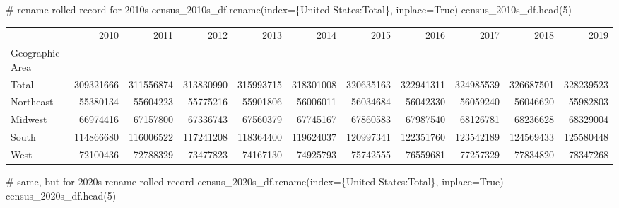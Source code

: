 \documentclass[
  letterpaper,
  DIV=11,
  numbers=noendperiod]{scrreprt}
\newenvironment{Shaded}{\begin{snugshade}}{\end{snugshade}}
\newcommand{\CommentTok}[1]{\textcolor[rgb]{0.37,0.37,0.37}{#1}}
\newcommand{\DecValTok}[1]{\textcolor[rgb]{0.68,0.00,0.00}{#1}}
\newcommand{\NormalTok}[1]{\textcolor[rgb]{0.00,0.23,0.31}{#1}}
\newcommand{\OperatorTok}[1]{\textcolor[rgb]{0.37,0.37,0.37}{#1}}
\newcommand{\StringTok}[1]{\textcolor[rgb]{0.13,0.47,0.30}{#1}}
\newcommand{\VariableTok}[1]{\textcolor[rgb]{0.07,0.07,0.07}{#1}}
\begin{document}
\begin{Shaded}
\begin{Highlighting}[]
\CommentTok{\# rename rolled record for 2010s}
\NormalTok{census\_2010s\_df.rename(index}\OperatorTok{=}\NormalTok{\{}\StringTok{\textquotesingle{}United States\textquotesingle{}}\NormalTok{:}\StringTok{\textquotesingle{}Total\textquotesingle{}}\NormalTok{\}, inplace}\OperatorTok{=}\VariableTok{True}\NormalTok{)}
\NormalTok{census\_2010s\_df.head(}\DecValTok{5}\NormalTok{)}
\end{Highlighting}
\end{Shaded}

\begin{tabular}{lrrrrrrrrrr}
\toprule
{} &       2010 &       2011 &       2012 &       2013 &       2014 &       2015 &       2016 &       2017 &       2018 &       2019 \\
Geographic Area &            &            &            &            &            &            &            &            &            &            \\
\midrule
Total           &  309321666 &  311556874 &  313830990 &  315993715 &  318301008 &  320635163 &  322941311 &  324985539 &  326687501 &  328239523 \\
Northeast       &   55380134 &   55604223 &   55775216 &   55901806 &   56006011 &   56034684 &   56042330 &   56059240 &   56046620 &   55982803 \\
Midwest         &   66974416 &   67157800 &   67336743 &   67560379 &   67745167 &   67860583 &   67987540 &   68126781 &   68236628 &   68329004 \\
South           &  114866680 &  116006522 &  117241208 &  118364400 &  119624037 &  120997341 &  122351760 &  123542189 &  124569433 &  125580448 \\
West            &   72100436 &   72788329 &   73477823 &   74167130 &   74925793 &   75742555 &   76559681 &   77257329 &   77834820 &   78347268 \\
\bottomrule
\end{tabular}

\begin{Shaded}
\begin{Highlighting}[]
\CommentTok{\# same, but for 2020s rename rolled record}
\NormalTok{census\_2020s\_df.rename(index}\OperatorTok{=}\NormalTok{\{}\StringTok{\textquotesingle{}United States\textquotesingle{}}\NormalTok{:}\StringTok{\textquotesingle{}Total\textquotesingle{}}\NormalTok{\}, inplace}\OperatorTok{=}\VariableTok{True}\NormalTok{)}
\NormalTok{census\_2020s\_df.head(}\DecValTok{5}\NormalTok{)}
\end{Highlighting}
\end{Shaded}
\end{document}

